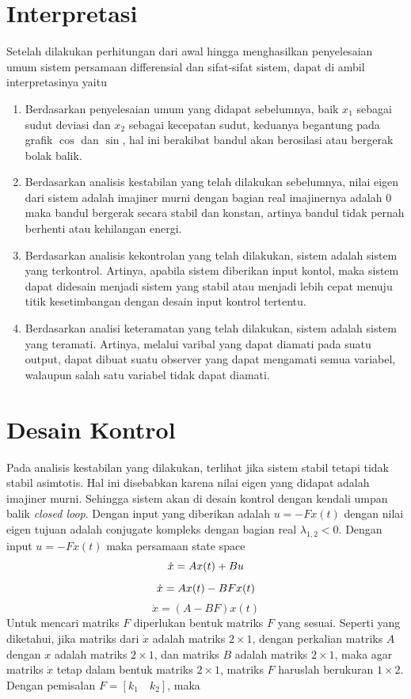 \documentclass{article}
\begin{document}
\section{Interpretasi}
\indent Setelah dilakukan perhitungan dari awal hingga menghasilkan penyelesaian umum sistem persamaan differensial dan sifat-sifat sistem, dapat di ambil interpretasinya yaitu
\begin{enumerate}
    \item Berdasarkan penyelesaian umum yang didapat sebelumnya, baik $x_1$ sebagai sudut deviasi dan $x_2$ sebagai kecepatan sudut, keduanya begantung pada grafik $\cos$ dan $\sin$, hal ini berakibat bandul akan berosilasi atau bergerak bolak balik.

    \item Berdasarkan analisis kestabilan yang telah dilakukan sebelumnya, nilai eigen dari sistem adalah imajiner murni dengan bagian real imajinernya adalah $0$ maka bandul bergerak secara stabil dan konstan,  artinya bandul tidak pernah berhenti atau kehilangan energi.

    \item Berdasarkan analisis kekontrolan yang telah dilakukan, sistem adalah sistem yang terkontrol. Artinya, apabila sistem diberikan input kontol, maka sistem dapat didesain menjadi sistem yang stabil atau menjadi lebih cepat menuju titik kesetimbangan dengan desain input kontrol tertentu.

    \item Berdasarkan analisi keteramatan yang telah dilakukan, sistem adalah sistem yang teramati. Artinya, melalui varibal yang dapat diamati pada suatu output, dapat dibuat suatu observer yang dapat mengamati semua variabel, walaupun salah satu variabel tidak dapat diamati.

\end{enumerate}

\section{Desain Kontrol}
Pada analisis kestabilan yang dilakukan, terlihat jika sistem stabil tetapi tidak stabil asimtotis. Hal ini disebabkan karena nilai eigen yang didapat adalah imajiner murni. Sehingga sistem akan di desain kontrol dengan kendali umpan balik \textit{closed loop}. Dengan input yang diberikan adalah $u = -Fx(t)$ dengan nilai eigen tujuan adalah conjugate kompleks dengan bagian real $\lambda_{1,2} < 0$. Dengan input $u = -Fx(t)$ maka persamaan state space
\[ \dot{x} = Ax(t) + Bu \\ \]
\[ \dot{x} = Ax(t) - BFx(t) \\ \]
\[ \dot{x} = (A - BF)x(t) \]
Untuk mencari matriks $F$ diperlukan bentuk matriks $F$ yang sesuai. Seperti yang diketahui, jika matriks dari $\dot{x}$ adalah matriks $2 \times 1$, dengan perkalian matriks $A$ dengan $x$ adalah matriks $2 \times 1$, dan matriks $B$ adalah matriks $2 \times 1$, maka agar matriks $\dot{x}$ tetap dalam bentuk matriks $2 \times 1$, matriks $F$ haruslah berukuran $1 \times 2$. Dengan pemisalan $F = [k_1 \quad k_2]$, maka
\end{document}
